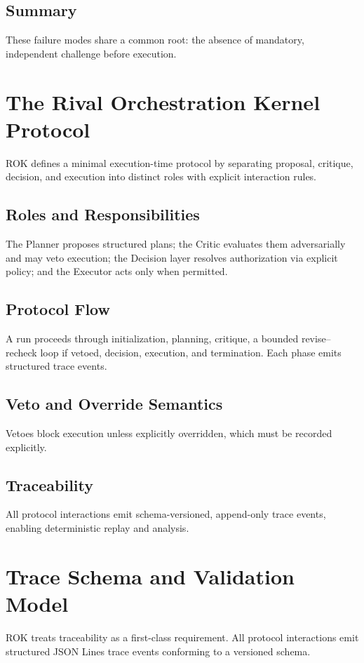 \documentclass[11pt]{article}
\begin{document}
\subsection{Summary}
These failure modes share a common root: the absence of mandatory, independent challenge before execution.

\section{The Rival Orchestration Kernel Protocol}
ROK defines a minimal execution-time protocol by separating proposal, critique, decision, and execution into distinct roles with explicit interaction rules.

\subsection{Roles and Responsibilities}
The Planner proposes structured plans; the Critic evaluates them adversarially and may veto execution; the Decision layer resolves authorization via explicit policy; and the Executor acts only when permitted.

\subsection{Protocol Flow}
A run proceeds through initialization, planning, critique, a bounded revise–recheck loop if vetoed, decision, execution, and termination. Each phase emits structured trace events.

\subsection{Veto and Override Semantics}
Vetoes block execution unless explicitly overridden, which must be recorded explicitly.

\subsection{Traceability}
All protocol interactions emit schema-versioned, append-only trace events, enabling deterministic replay and analysis.

\section{Trace Schema and Validation Model}
ROK treats traceability as a first-class requirement. All protocol interactions emit structured JSON Lines trace events conforming to a versioned schema.
\end{document}
